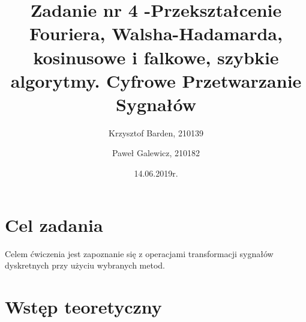 \documentclass[12pt]{article}
\title{{\bf Zadanie nr 4 -Przekształcenie Fouriera, Walsha-Hadamarda, kosinusowe i falkowe,
szybkie algorytmy.}\linebreak
Cyfrowe Przetwarzanie Sygnałów}
\author{Krzysztof Barden, 210139 \and Paweł Galewicz, 210182}
\date{14.06.2019r.}
\begin{document}
\clearpage\maketitle
\thispagestyle{empty}
\newpage
\setcounter{page}{1}
\section{Cel zadania}

Celem ćwiczenia jest zapoznanie się z operacjami transformacji sygnałów dyskretnych
przy użyciu wybranych metod.



\section{Wstęp teoretyczny}
\end{document}
